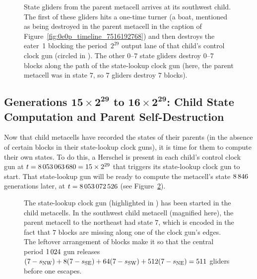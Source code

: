 \begin{figure}[!htb]
	\centering
	\caption{State gliders from the parent metacell arrives at its southwest child. The first of these gliders hits a one-time turner (a boat, mentioned as being destroyed in the parent metacell in the caption of Figure~\ref{fig:0e0p_timeline_7516192768}) and then destroys the eater~1 blocking the period~$2^{29}$ output lane of that child's control clock gun (circled in ). The other $0$--$7$ state gliders destroy $0$--$7$ blocks along the path of the state-lookup clock gun (here, the parent metacell was in state $7$, so $7$ gliders destroy $7$ blocks).}
	\label{fig:0e0p_timeline_7517755585}
\end{figure}


\subsection{Generations $\mathbf{15 \times 2^{29}}$ to $\mathbf{16 \times 2^{29}}$: Child State Computation and Parent Self-Destruction}\label{sec:0e0p_timeline_self_dest}

Now that child metacells have recorded the states of their parents (in the absence of certain blocks in their state-lookup clock guns), it is time for them to compute their own states. To do this, a Herschel is present in each child's control clock gun at $t = 8{\,}053{\,}063{\,}680 = 15 \times 2^{29}$ that triggers its state-lookup clock gun to start. That state-lookup gun will be ready to compute the metacell's state $8{\,}846$ generations later, at $t = 8{\,}053{\,}072{\,}526$ (see Figure~\ref{fig:0e0p_timeline_8053072526}).

\begin{figure}[!htb]
	\centering
	\caption{The state-lookup clock gun (highlighted in ) has been started in the child metacells. In the southwest child metacell (magnified here), the parent metacell to the northeast had state $7$, which is encoded in the fact that $7$ blocks are missing along one of the clock gun's edges. The leftover arrangement of blocks make it so that the central period $1{\,}024$ gun releases $(7-s_{\textup{NW}}) + 8(7-s_{\textup{SE}}) + 64(7-s_{\textup{SW}}) + 512(7-s_{\textup{NE}}) = 511$ gliders before one escapes.}
	\label{fig:0e0p_timeline_8053072526}
\end{figure}

